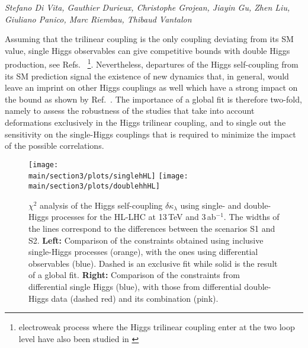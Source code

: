 \begin{center}
	\textit{Stefano Di Vita, Gauthier Durieux, Christophe Grojean, Jiayin Gu, Zhen Liu, Giuliano Panico, Marc Riembau, Thibaud Vantalon}
\end{center} 

Assuming that the trilinear coupling is the only coupling deviating from its SM value, single Higgs observables can give competitive bounds with double Higgs production, see Refs.~\cite{Gorbahn:2016uoy,Degrassi:2016wml,Bizon:2016wgr,Degrassi:2017ucl,Maltoni:2017ims} \footnote{electroweak process where the Higgs trilinear coupling enter at the two loop level have also been studied in \cite{Kribs:2017znd}}. Nevertheless, departures of the Higgs self-coupling from its SM prediction signal the existence of new dynamics that, in general, would leave an imprint on other Higgs couplings as well which have a strong impact on the bound as shown by Ref.~\cite{DiVita:2017eyz}. The importance of a global fit is therefore two-fold, namely to assess the robustness of the studies that take into account deformations exclusively in the Higgs trilinear coupling, and to single out the sensitivity on the single-Higgs couplings that is required to minimize the impact of the possible correlations.
\medskip

\begin{figure}
	\centering
	\texttt{[image: \\main/section3/plots/singlehHL]}\hfill
	\texttt{[image: \\main/section3/plots/doublehhHL]}
	\caption{$\chi^2$ analysis of the Higgs self-coupling $\delta \kappa_\lambda$ using single- and double-Higgs processes for the HL-LHC at 13\,TeV and 3\,ab$^{-1}$. The widths of the lines correspond to the differences between the scenarios S1 and S2. \textbf{Left:} Comparison of the constraints obtained using inclusive single-Higgs processes (orange), with the ones using differential observables (blue). Dashed is an exclusive fit while solid is the result of a global fit. \textbf{Right:} Comparison of the constraints from differential single Higgs (blue), with those from differential double-Higgs data (dashed red) and its combination (pink).}
	\label{fig:hllhcchi2}
\end{figure}

